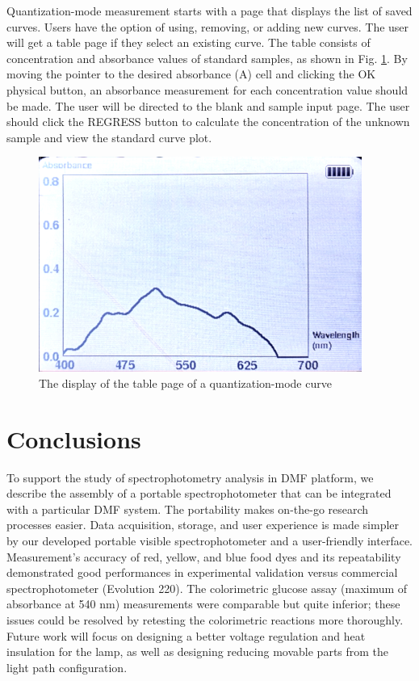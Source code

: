 \documentclass[conference]{IEEEtran}
\begin{document}
Quantization-mode measurement starts with a page that displays the list of saved curves.
Users have the option of using, removing, or adding new curves.
The user will get a table page if they select an existing curve.
The table consists of concentration and absorbance values of standard samples, as shown in Fig. \ref{lcd-table}.
By moving the pointer to the desired absorbance (A) cell and clicking the OK physical button, an absorbance measurement for each concentration value should be made.
The user will be directed to the blank and sample input page.
The user should click the REGRESS button to calculate the concentration of the unknown sample and view the standard curve plot.

    \begin{figure}[htbp]
    \centerline{\includegraphics[scale=0.6]{lcd-table.png}}
    \caption{The display of the table page of a quantization-mode curve}
    \label{lcd-table}
    \end{figure}

\section{Conclusions}
To support the study of spectrophotometry analysis in DMF platform, we describe the assembly of a portable spectrophotometer that can be integrated with a particular DMF system.
The portability makes on-the-go research processes easier.
Data acquisition, storage, and user experience is made simpler by our developed portable visible spectrophotometer and a user-friendly interface.
Measurement's accuracy of red, yellow, and blue food dyes and its repeatability demonstrated good performances in experimental validation versus commercial spectrophotometer (Evolution 220).
The colorimetric glucose assay (maximum of absorbance at 540 nm) measurements were comparable but quite inferior; these issues could be resolved by retesting the colorimetric reactions more thoroughly.
Future work will focus on designing a better voltage regulation and heat insulation for the lamp, as well as designing reducing movable parts from the light path configuration.
\end{document}
